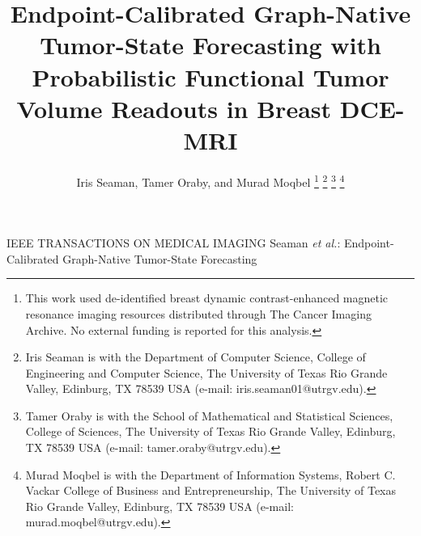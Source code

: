 \documentclass[journal,twoside,print]{ieeecolor}
\begin{document}
\title{Endpoint-Calibrated Graph-Native Tumor-State Forecasting with Probabilistic Functional Tumor Volume Readouts in Breast DCE-MRI}

\author{Iris Seaman, Tamer Oraby, and Murad Moqbel
\thanks{This work used de-identified breast dynamic contrast-enhanced magnetic
resonance imaging resources distributed through The Cancer Imaging Archive. No
external funding is reported for this analysis.}
\thanks{Iris Seaman is with the Department of Computer Science, College of
Engineering and Computer Science, The University of Texas Rio Grande Valley,
Edinburg, TX 78539 USA (e-mail: iris.seaman01@utrgv.edu).}
\thanks{Tamer Oraby is with the School of Mathematical and Statistical
Sciences, College of Sciences, The University of Texas Rio Grande Valley,
Edinburg, TX 78539 USA (e-mail: tamer.oraby@utrgv.edu).}
\thanks{Murad Moqbel is with the Department of Information Systems, Robert C.
Vackar College of Business and Entrepreneurship, The University of Texas Rio
Grande Valley, Edinburg, TX 78539 USA (e-mail: murad.moqbel@utrgv.edu).}}

\markboth
{\hskip25pc IEEE TRANSACTIONS ON MEDICAL IMAGING}
{Seaman \MakeLowercase{\textit{et al.}}: Endpoint-Calibrated Graph-Native Tumor-State Forecasting}

\maketitle
\end{document}
